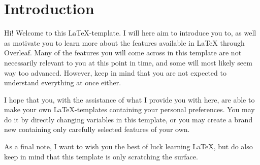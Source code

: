 \section{Introduction}

Hi! 
Welcome to this \LaTeX-template. I will here aim to introduce you to, as well as motivate you to learn more about the features available in LaTeX through Overleaf. Many of the features you will come across in this template are not necessarily relevant to you at this point in time, and some will most likely seem way too advanced. However, keep in mind that you are not expected to understand everything at once either.

I hope that you, with the assistance of what I provide you with here, are able to make your own LaTeX-templates containing your personal preferences. You may do it by directly changing variables in this template, or you may create a brand new containing only carefully selected features of your own. 

As a final note, I want to wish you the best of luck learning LaTeX, but do also keep in mind that this template is only scratching the surface.

\nocite{imt_software_wiki}  %